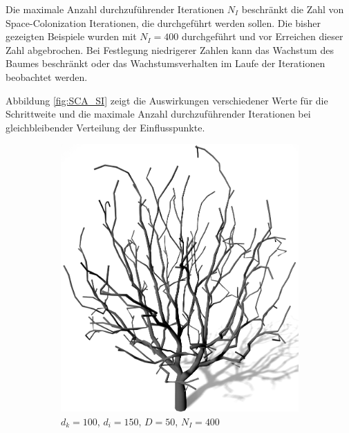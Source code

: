 Die maximale Anzahl durchzuführender Iterationen $N_I$ beschränkt die Zahl von Space-Colonization Iterationen, die durchgeführt werden sollen. Die bisher gezeigten Beispiele wurden mit $N_I = 400$ durchgeführt und vor Erreichen dieser Zahl abgebrochen. Bei Festlegung niedrigerer Zahlen kann das Wachstum des Baumes beschränkt oder das Wachstumsverhalten im Laufe der Iterationen beobachtet werden.

Abbildung \ref{fig:SCA_SI} zeigt die Auswirkungen verschiedener Werte für die Schrittweite und die maximale Anzahl durchzuführender Iterationen bei gleichbleibender Verteilung der Einflusspunkte.

\begin{figure} [hbtp]
	\centering
	\begin{subfigure}[t]{.45\textwidth}
		\centering
		\includegraphics[height=.21\textheight]{images/SCA_SI_SchrittweiteHigh.png}
		\caption{$d_k = 100$, $d_i = 150$, $D = 50$, $N_I = 400$}
		\label{subfig:SCA_SI_SchrittweiteHigh}
	\end{subfigure}
	\hspace{.05\linewidth}
	\begin{subfigure}[t]{.45\textwidth}
		\centering

\end{subfigure}
\end{figure}
